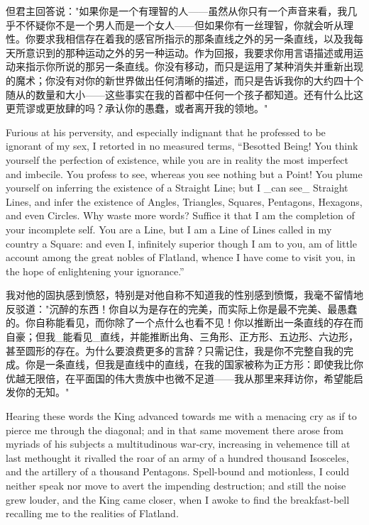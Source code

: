 \documentclass[12pt,UTF8]{ctexbook}
\begin{document}
但君主回答说："如果你是一个有理智的人——虽然从你只有一个声音来看，我几乎不怀疑你不是一个男人而是一个女人——但如果你有一丝理智，你就会听从理性。你要求我相信存在着我的感官所指示的那条直线之外的另一条直线，以及我每天所意识到的那种运动之外的另一种运动。作为回报，我要求你用言语描述或用运动来指示你所说的那另一条直线。你没有移动，而只是运用了某种消失并重新出现的魔术；你没有对你的新世界做出任何清晰的描述，而只是告诉我你的大约四十个随从的数量和大小——这些事实在我的首都中任何一个孩子都知道。还有什么比这更荒谬或更放肆的吗？承认你的愚蠢，或者离开我的领地。"

Furious at his perversity, and especially indignant that he professed to be ignorant of my sex, I retorted in no measured terms, ``Besotted Being! You think yourself the perfection of existence, while you are in reality the most imperfect and imbecile. You profess to see, whereas you see nothing but a Point! You plume yourself on inferring the existence of a Straight Line; but I \_can see\_ Straight Lines, and infer the existence of Angles, Triangles, Squares, Pentagons, Hexagons, and even Circles. Why waste more words? Suffice it that I am the completion of your incomplete self. You are a Line, but I am a Line of Lines called in my country a Square: and even I, infinitely superior though I am to you, am of little account among the great nobles of Flatland, whence I have come to visit you, in the hope of enlightening your ignorance.''

我对他的固执感到愤怒，特别是对他自称不知道我的性别感到愤慨，我毫不留情地反驳道："沉醉的东西！你自以为是存在的完美，而实际上你是最不完美、最愚蠢的。你自称能看见，而你除了一个点什么也看不见！你以推断出一条直线的存在而自豪；但我\_能看见\_直线，并能推断出角、三角形、正方形、五边形、六边形，甚至圆形的存在。为什么要浪费更多的言辞？只需记住，我是你不完整自我的完成。你是一条直线，但我是直线中的直线，在我的国家被称为正方形：即使我比你优越无限倍，在平面国的伟大贵族中也微不足道——我从那里来拜访你，希望能启发你的无知。"

Hearing these words the King advanced towards me with a menacing cry as if to pierce me through the diagonal; and in that same movement there arose from myriads of his subjects a multitudinous war-cry, increasing in vehemence till at last methought it rivalled the roar of an army of a hundred thousand Isosceles, and the artillery of a thousand Pentagons. Spell-bound and motionless, I could neither speak nor move to avert the impending destruction; and still the noise grew louder, and the King came closer, when I awoke to find the breakfast-bell recalling me to the realities of Flatland.
\end{document}
